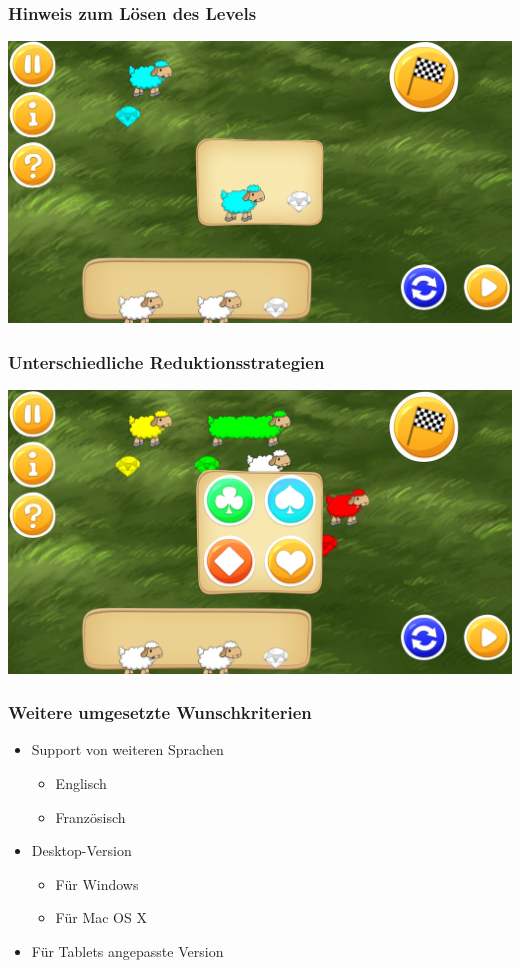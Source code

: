 \documentclass[18pt]{beamer}
\begin{document}
\begin{frame}
	\frametitle{Hinweis zum Lösen des Levels}
	\includegraphics[width=\textwidth]{pictures/hintbutton}
\end{frame}

\begin{frame}
	\frametitle{Unterschiedliche Reduktionsstrategien}
	\includegraphics[width=\textwidth]{pictures/reduction_strategies}
\end{frame}

\begin{frame}
	\frametitle{Weitere umgesetzte Wunschkriterien}
	\begin{itemize}[<+->]
		\item Support von weiteren Sprachen
		\begin{itemize}
			\item Englisch
			\item Französisch
		\end{itemize}
		\item Desktop-Version
		\begin{itemize}
			\item Für Windows
			\item Für Mac OS X
		\end{itemize}
		\item Für Tablets angepasste Version
	\end{itemize}
\end{frame}
\end{document}
